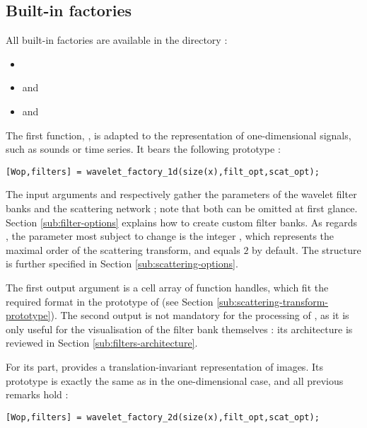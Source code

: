 \documentclass{article}
\begin{document}
\subsection{Built-in factories}
All built-in factories are available in the  directory :

\begin{itemize}
   \item {}
   \item {} and 
   \item {} and 
\end{itemize}

The first function, , is adapted to the representation of one-dimensional signals, such as sounds or time series. It bears the following prototype :

\begin{lstlisting}
[Wop,filters] = wavelet_factory_1d(size(x),filt_opt,scat_opt);
\end{lstlisting}

The input arguments  and  respectively gather the parameters of the wavelet filter banks and the scattering network ; note that both can be omitted at first glance. Section \ref{sub:filter-options} explains how to create custom filter banks. As regards , the parameter most subject to change is the integer , which represents the maximal order of the scattering transform, and equals $2$ by default. The  structure is further specified in Section \ref{sub:scattering-options}.

The first output argument is a cell array of function handles, which fit the required format in the prototype of  (see Section \ref{sub:scattering-transform-prototype}). The second output is not mandatory for the processing of , as it is only useful for the visualisation of the filter bank themselves : its architecture is reviewed in Section \ref{sub:filters-architecture}.

For its part,  provides a translation-invariant representation of images. Its prototype is exactly the same as in the one-dimensional case, and all previous remarks hold :

\begin{lstlisting}
[Wop,filters] = wavelet_factory_2d(size(x),filt_opt,scat_opt);
\end{lstlisting}
\end{document}

